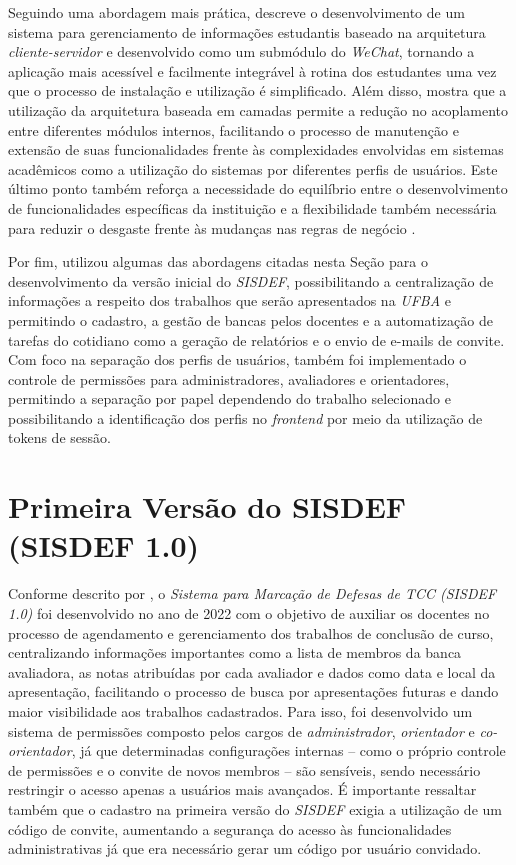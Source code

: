 \documentclass[nonacm, sigconf]{acmart}
\begin{document}
Seguindo uma abordagem mais prática, \cite{wu2020} descreve o desenvolvimento de um sistema para gerenciamento de informações estudantis baseado na arquitetura \textit{cliente-servidor} e desenvolvido como um submódulo do \textit{WeChat}, tornando a aplicação mais acessível e facilmente integrável à rotina dos estudantes uma vez que o processo de instalação e utilização é simplificado. Além disso, mostra que a utilização da arquitetura baseada em camadas permite a redução no acoplamento entre diferentes módulos internos, facilitando o processo de manutenção e extensão de suas funcionalidades frente às complexidades envolvidas em sistemas acadêmicos como a utilização do sistemas por diferentes perfis de usuários. Este último ponto também reforça a necessidade do equilíbrio entre o desenvolvimento de funcionalidades específicas da instituição e a flexibilidade também necessária para reduzir o desgaste frente às mudanças nas regras de negócio \cite{rainer2015introdução, sis}.

Por fim, \cite{gabrieltcc} utilizou algumas das abordagens citadas nesta Seção para o desenvolvimento da versão inicial do \textit{SISDEF}, possibilitando a centralização de informações a respeito dos trabalhos que serão apresentados na \textit{UFBA} e permitindo o cadastro, a gestão de bancas pelos docentes e a automatização de tarefas do cotidiano como a geração de relatórios e o envio de e-mails de convite. Com foco na separação dos perfis de usuários, também foi implementado o controle de permissões para administradores, avaliadores e orientadores, permitindo a separação por papel dependendo do trabalho selecionado e possibilitando a identificação dos perfis no \textit{frontend} por meio da utilização de tokens de sessão.

\section{Primeira Versão do SISDEF (SISDEF 1.0)}
\label{section:sisdef_v1}

Conforme descrito por \cite{gabrieltcc}, o \textit{Sistema para Marcação de Defesas de TCC (SISDEF 1.0)} foi desenvolvido no ano de 2022 com o objetivo de auxiliar os docentes no processo de agendamento e gerenciamento dos trabalhos de conclusão de curso, centralizando informações importantes como a lista de membros da banca avaliadora, as notas atribuídas por cada avaliador e dados como data e local da apresentação, facilitando o processo de busca por apresentações futuras e dando maior visibilidade aos trabalhos cadastrados. Para isso, foi desenvolvido um sistema de permissões composto pelos cargos de \textit{administrador}, \textit{orientador} e \textit{co-orientador}, já que determinadas configurações internas -- como o próprio controle de permissões e o convite de novos membros -- são sensíveis, sendo necessário restringir o acesso apenas a usuários mais avançados. É importante ressaltar também que o cadastro na primeira versão do \textit{SISDEF} exigia a utilização de um código de convite, aumentando a segurança do acesso às funcionalidades administrativas já que era necessário gerar um código por usuário convidado.
\end{document}
